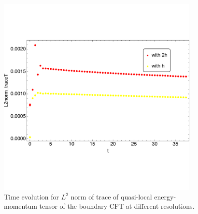 \documentclass[12pt]{iopart} %
\begin{document}
\begin{figure}[h]
        \centering
        \includegraphics[width=4.0in,clip=true]{plots/timeseries/L2norm_quasiset_trace/fullplotL2normtraceL2L3res-cropped.pdf}
\parbox{5.0in}{\caption{Time evolution for $L^2$ norm of trace of quasi-local energy-momentum tensor of the boundary CFT at different resolutions.
        }\label{fig:L2norm_quasisettrace-crop}}
\end{figure}
\end{document}
